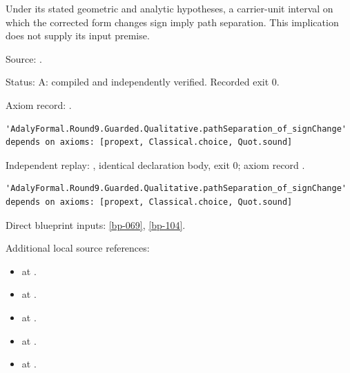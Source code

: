 \begin{theorem}[bp-278]
\label{bp-278}
\leanok
Under its stated geometric and analytic hypotheses, a carrier-unit interval on which the corrected form changes sign imply path separation. This implication does not supply its input premise.

\par Source: \texttt{}.
\par Status: A: compiled and independently verified. Recorded exit 0.
\par Axiom record: \texttt{}.
\begin{verbatim}
'AdalyFormal.Round9.Guarded.Qualitative.pathSeparation_of_signChange' depends on axioms: [propext, Classical.choice, Quot.sound]
\end{verbatim}
\par Independent replay: \texttt{}, identical declaration body, exit 0; axiom record \texttt{}.
\begin{verbatim}
'AdalyFormal.Round9.Guarded.Qualitative.pathSeparation_of_signChange' depends on axioms: [propext, Classical.choice, Quot.sound]
\end{verbatim}
\par Direct blueprint inputs: \ref{bp-069}, \ref{bp-104}.
\par Additional local source references:
\begin{itemize}
\item \texttt{} at \texttt{}.
\item \texttt{} at \texttt{}.
\item \texttt{} at \texttt{}.
\item \texttt{} at \texttt{}.
\item \texttt{} at \texttt{}.

\end{itemize}
\end{theorem}
